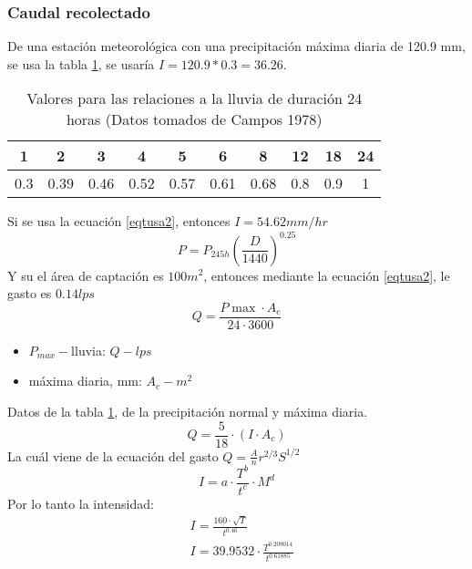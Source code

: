 \subsubsection{Caudal recolectado}
De una estación meteorológica con una precipitación máxima diaria de 120.9 mm, se usa la tabla \ref{tabtusa6}, se usaría $I=120.9*0.3=36.26$. 
\begin{table}[h!]
    \centering
    \begin{tabular}{@{}cccccccccc@{}}
    \toprule
    1   & 2    & 3    & 4    & 5    & 6    & 8    & 12  & 18  & 24 \\ \midrule
    0.3 & 0.39 & 0.46 & 0.52 & 0.57 & 0.61 & 0.68 & 0.8 & 0.9 & 1  \\ \bottomrule
    \end{tabular}
    \caption{Valores para las relaciones a la lluvia de duración 24 horas (Datos tomados de Campos 1978)}
    \label{tabtusa6}
\end{table}
Si se usa la ecuación \eqref{eqtusa2}, entonces $I=54.62mm/hr$
\begin{equation}
    P = P_{245h}\left(\frac{D}{1440}\right)^{0.25}
    \label{eqtusa2}
\end{equation}
Y su el área de captación es $100m^2$, entonces mediante la ecuación \eqref{eqtusa2}, le gasto es $0.14lps$
\begin{equation}
    Q =\frac{P {\max} \cdot A_c}{24 \cdot 3600}
    \label{eqtusa3}
\end{equation}
\begin{notation}
    \begin{itemize}
        \item $P_{max}-$lluvia: $Q-lps$
        \item máxima diaria, mm: $A_c-m^2$
    \end{itemize}
\end{notation}
Datos de la tabla \ref{tabtusa6}, de la precipitación normal y máxima diaria.
\begin{equation}
    Q = \frac{5}{18} \cdot \left(I \cdot A_c\right)
\end{equation}
La cuál viene de la ecuación del gasto $Q=\frac{A}{n}r^{2/3}S^{1/2}$
\begin{equation}
    I = a \cdot \frac{T^b}{t^c} \cdot M^d
\end{equation}
Por lo tanto la intensidad:
\begin{align*}
    &I=\frac{160 \cdot \sqrt{T}}{t^{0.46}}\\
    &I = 39.9532 \cdot \frac{T^{0.209014}}{t^{0.61885}}
\end{align*}
